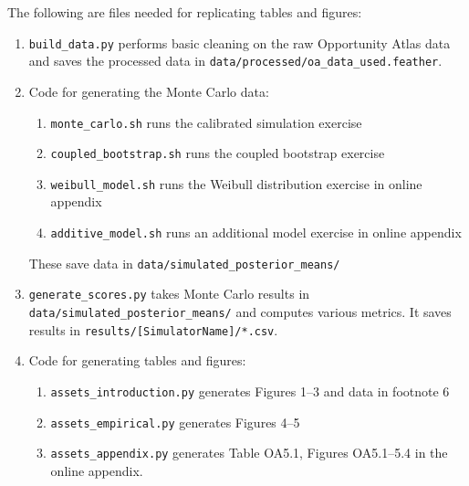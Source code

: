 \documentclass[10pt]{article}
\begin{document}
The following are files needed for replicating tables and figures:
\begin{enumerate}
\item \texttt{build\_data.py} performs basic cleaning on the raw Opportunity Atlas data
and saves the processed data in \texttt{data/processed/oa\_data\_used.feather}. 
  \item Code for generating the Monte Carlo data:
  \begin{enumerate}
  \item \texttt{monte\_carlo.sh} runs the calibrated simulation exercise

\item \texttt{coupled\_bootstrap.sh} runs the coupled bootstrap exercise

\item \texttt{weibull\_model.sh} runs the Weibull distribution exercise in online appendix

\item \texttt{additive\_model.sh} runs an additional model exercise in online appendix
\end{enumerate}
These save data in \texttt{data/simulated\_posterior\_means/}
\item \texttt{generate\_scores.py} takes Monte Carlo results in 
\texttt{data/simulated\_posterior\_means/} and computes various metrics. It saves results
in \texttt{results/[SimulatorName]/*.csv}.
\item Code for generating tables and figures:
\begin{enumerate}
  \item \texttt{assets\_introduction.py} generates Figures 1--3 and data in footnote 6
  \item \texttt{assets\_empirical.py} generates Figures 4--5
  \item \texttt{assets\_appendix.py} generates Table OA5.1, Figures OA5.1--5.4 in the
  online appendix. 
\end{enumerate}
\end{enumerate}
\end{document}
